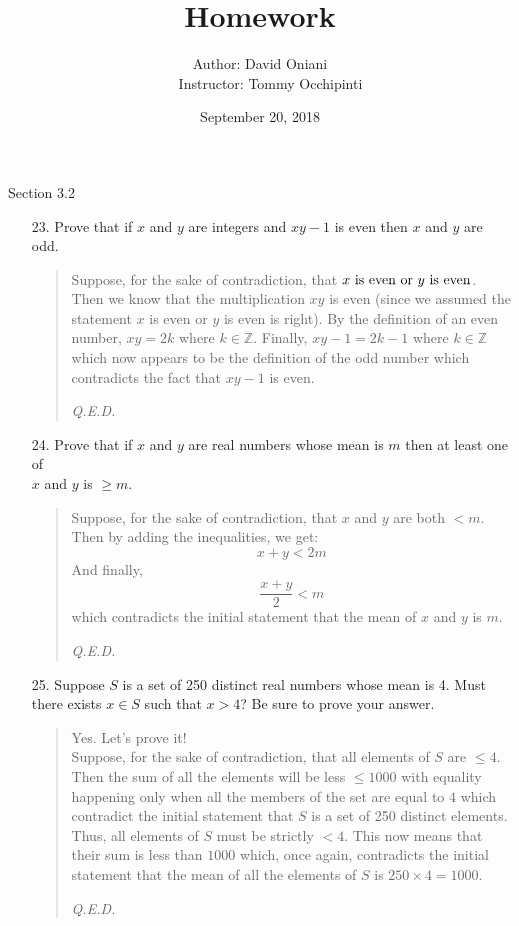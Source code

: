 \documentclass[12pt, a4paper]{article}                      %
\title{\bf{Homework \textnumero 4}}
\author{Author: David Oniani
\\
\ \ \ Instructor: Tommy Occhipinti}
\date{September 20, 2018}
\begin{document}
\maketitle

{\large Section 3.2}
\\

\begin{enumerate}
\item[23.]
Prove that if $x$ and $y$ are integers and $xy - 1$ is even then $x$ and $y$ are odd.
\begin{quote}
Suppose, for the sake of contradiction, that $x \textnormal{ is even or } y \textnormal{ is even}$.
Then we know that the multiplication $xy$ is even (since we assumed the statement $x$ is even or $y$ is even is right).
By the definition of an even number, $xy = 2k$ where $k \in \mathbb{Z}$.
Finally, $xy - 1 = 2k - 1$ where $k \in \mathbb{Z}$ which now appears to be the definition
of the odd number which contradicts the fact that $xy - 1$ is even.
\begin{flushright}
\textit{Q.E.D.}
\end{flushright}
\end{quote}

\item[24.]
Prove that if $x$ and $y$ are real numbers whose mean is $m$ then at least one of\\
$x$ and $y$ is $\geq m$.
\begin{quote}
Suppose, for the sake of contradiction, that $x$ and $y$ are both $< m$.
Then by adding the inequalities, we get:
$$
x + y < 2m
$$
And finally,
$$
\dfrac{x + y}{2} < m
$$
which contradicts the initial statement that the mean of $x$ and $y$ is $m$.
\begin{flushright}
\textit{Q.E.D.}
\end{flushright}
\end{quote}

\item[25.]
Suppose $S$ is a set of 250 distinct real numbers whose mean is 4. Must there exists
$x \in S$ such that $x > 4$? Be sure to prove your answer.
\begin{quote}
Yes. Let's prove it!\\
Suppose, for the sake of contradiction, that all elements of $S$ are $\leq 4$.
Then the sum of all the elements will be less $\leq 1000$ with equality happening only
when all the members of the set are equal to $4$ which contradict the initial statement that
$S$ is a set of 250 distinct elements. Thus, all elements of $S$ must be strictly $< 4$.
This now means that their sum is less than $1000$ which, once again, contradicts the initial
statement that the mean of all the elements of $S$ is  $250 \times 4 = 1000$.
\begin{flushright}
\textit{Q.E.D.}
\end{flushright}
\end{quote}


\end{enumerate}
\end{document}

